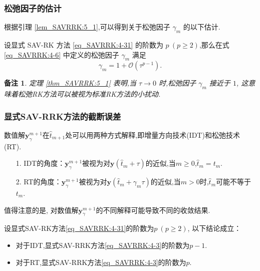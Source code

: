 \documentclass[aspectratio=169]{beamer}
\newtheorem{remark}[theorem]{备注} %
\numberwithin{theorem}{section} %
\begin{document}
\begin{frame}\frametitle{松弛因子的估计}

	根据引理 \ref{lem_SAVRRK:5_1},可以得到关于松弛因子 $\gamma_m$ 的以下估计.

	\begin{theorem}\label{thm_SAVRRK:5_1}
	设显式 SAV-RK 方法 \eqref{eq_SAVRRK:4-31} 的阶数为 $p~(p \geq 2)$,那么在式 \eqref{eq_SAVRRK:4-6} 中定义的松弛因子 $\gamma_m$ 满足
	\begin{equation}\label{eq_SAVRRK:5_3}
	\gamma_m=1+\mathcal{O}(\tau^{p-1}).
	\end{equation}
	\end{theorem}	
	\begin{remark}\label{rk_SAVRRK:5_1}
		定理 \ref{thm_SAVRRK:5_1} 表明,当 $\tau\rightarrow 0$ 时,松弛因子 $\gamma_m$ 接近于 $1$,
		这意味着松弛RK方法可以被视为标准RK方法的小扰动.
		\end{remark}
\end{frame}
\begin{frame}\frametitle{显式SAV-RRK方法的截断误差}

	数值解$\bm{y}_\gamma^{m+1}$在$\hat{t}_{m+1}$处可以用两种方式解释\cite{ketchesonRelaxationRungeKutta2019},即增量方向技术(IDT)和松弛技术(RT).
	\begin{itemize}
	\item[1.] IDT的角度：$\bm{y}_\gamma^{m+1}$被视为对$\bm{y}\left(\hat{t}_m+\tau\right)$的近似,当$m \geq 0$,$\hat{t}_m=t_m$.
	\item[2.] RT的角度：$\bm{y}_\gamma^{m+1}$被视为对$\bm{y}\left(\hat{t}_m+\gamma_m \tau\right)$的近似,当$m>0$时,$\hat{t}_m$可能不等于$t_m$.
	\end{itemize}
	
	值得注意的是, 对数值解$\bm{y}_\gamma^{m+1}$的不同解释可能导致不同的收敛结果.

	\begin{theorem}\label{thm_SAVRRK:5_4}
	设显式SAV-RK方法\eqref{eq_SAVRRK:4-31}的阶数为$p~(p \geq 2)$, 以下结论成立：
	\begin{itemize}
	\item 对于IDT,显式SAV-RRK方法\eqref{eq_SAVRRK:4-3}的阶数为$p-1$.
	\item 对于RT,显式SAV-RRK方法\eqref{eq_SAVRRK:4-3}的阶数为$p$.
	\end{itemize}
	\end{theorem}
\end{frame}
\end{document}
